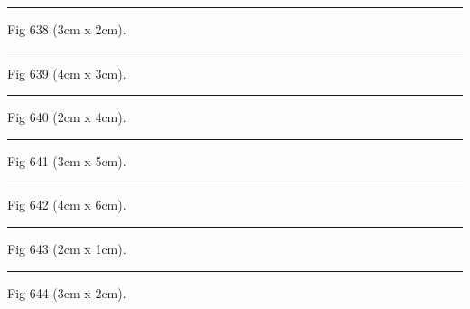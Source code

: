 \documentclass[a4paper,11pt]{article}
\begin{document}
\begin{swarmwrap}%
  \begin{minipage}[t]{3cm}
    \centering
    \rule{\linewidth}{2cm}
    {\footnotesize Fig 638 (3cm x 2cm).}
  \end{minipage}%
\end{swarmwrap}%
\swarmwrapnext
\lipsum[38]%

\begin{swarmwrap}%
  \begin{minipage}[t]{4cm}
    \centering
    \rule{\linewidth}{3cm}
    {\footnotesize Fig 639 (4cm x 3cm).}
  \end{minipage}%
\end{swarmwrap}%
\swarmwrapnext
\lipsum[39]%

\begin{swarmwrap}%
  \begin{minipage}[t]{2cm}
    \centering
    \rule{\linewidth}{4cm}
    {\footnotesize Fig 640 (2cm x 4cm).}
  \end{minipage}%
\end{swarmwrap}%
\swarmwrapnext
\lipsum[40]%

\begin{swarmwrap}%
  \begin{minipage}[t]{3cm}
    \centering
    \rule{\linewidth}{5cm}
    {\footnotesize Fig 641 (3cm x 5cm).}
  \end{minipage}%
\end{swarmwrap}%
\swarmwrapnext
\lipsum[41]%

\begin{swarmwrap}%
  \begin{minipage}[t]{4cm}
    \centering
    \rule{\linewidth}{6cm}
    {\footnotesize Fig 642 (4cm x 6cm).}
  \end{minipage}%
\end{swarmwrap}%
\swarmwrapnext
\lipsum[42]%

\begin{swarmwrap}%
  \begin{minipage}[t]{2cm}
    \centering
    \rule{\linewidth}{1cm}
    {\footnotesize Fig 643 (2cm x 1cm).}
  \end{minipage}%
\end{swarmwrap}%
\swarmwrapnext
\lipsum[43]%

\begin{swarmwrap}%
  \begin{minipage}[t]{3cm}
    \centering
    \rule{\linewidth}{2cm}
    {\footnotesize Fig 644 (3cm x 2cm).}
  \end{minipage}%
\end{swarmwrap}%
\swarmwrapnext
\lipsum[44]%
\end{document}
